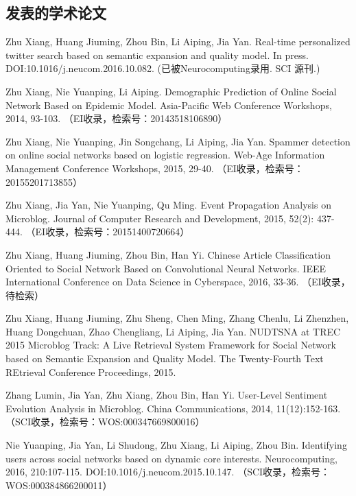 \begin{resume}

  \section*{发表的学术论文} %

  \begin{enumerate}[{[}1{]}]
  \addtolength{\itemsep}{-.36\baselineskip}%
  \item Zhu Xiang, Huang Jiuming, Zhou Bin, Li Aiping, Jia Yan. Real-time personalized twitter search based on semantic expansion and quality model. In press. DOI:10.1016/j.neucom.2016.10.082. (已被Neurocomputing录用. SCI 源刊.)
  \item Zhu Xiang, Nie Yuanping, Li Aiping. Demographic Prediction of Online Social Network Based on Epidemic Model. Asia-Pacific Web Conference Workshops, 2014, 93-103. （EI收录，检索号：20143518106890）
  \item Zhu Xiang, Nie Yuanping, Jin Songchang, Li Aiping, Jia Yan. Spammer detection on online social networks based on logistic regression. Web-Age Information Management Conference Workshops, 2015, 29-40. （EI收录，检索号：20155201713855）
  \item Zhu Xiang, Jia Yan, Nie Yuanping, Qu Ming. Event Propagation Analysis on Microblog. Journal of Computer Research and Development, 2015, 52(2): 437-444. （EI收录，检索号：20151400720664）
  \item Zhu Xiang, Huang Jiuming, Zhou Bin, Han Yi. Chinese Article Classification Oriented to Social Network Based on Convolutional Neural Networks. IEEE International Conference on Data Science in Cyberspace, 2016, 33-36. （EI收录，待检索）
  \item Zhu Xiang, Huang Jiuming, Zhu Sheng, Chen Ming, Zhang Chenlu, Li Zhenzhen, Huang Dongchuan, Zhao Chengliang, Li Aiping, Jia Yan. NUDTSNA at TREC 2015 Microblog Track: A Live Retrieval System Framework for Social Network based on Semantic Expansion and Quality Model. The Twenty-Fourth Text REtrieval Conference Proceedings, 2015.
  \item Zhang Lumin, Jia Yan, Zhu Xiang, Zhou Bin, Han Yi.  User-Level Sentiment Evolution Analysis in Microblog. China Communications, 2014, 11(12):152-163. （SCI收录，检索号：WOS:000347669800016）
  \item Nie Yuanping, Jia Yan, Li Shudong, Zhu Xiang, Li Aiping, Zhou Bin.  Identifying users across social networks based on dynamic core interests. Neurocomputing, 2016, 210:107-115. DOI:10.1016/j.neucom.2015.10.147. （SCI收录，检索号：WOS:000384866200011）

\end{enumerate}
\end{resume}
